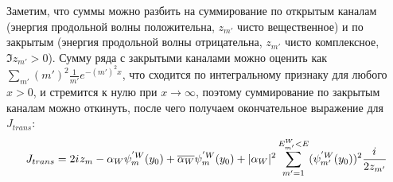 Заметим, что суммы можно разбить на суммирование по открытым каналам (энергия продольной волны положительна, $z_{m'}$ чисто вещественное) и по закрытым (энергия продольной волны отрицательна, $z_{m'}$ чисто комплексное, $\Im z_{m'} > 0$). Сумму ряда с закрытыми каналами можно оценить как $\sum\limits_{m'} (m')^2 \frac{1}{m'} e^{- (m')^2 x}$, что сходится по интегральному признаку для любого $x > 0$, и стремится к нулю при $x \to \infty$, поэтому суммирование по закрытым каналам можно откинуть, после чего получаем окончательное выражение для $J_{trans}$:
\begin{align*}
J_{trans} = 2 {i\mkern1mu} z_m - \alpha_W \psi_m^{'W}(y_0) + \overline{\alpha_W} \psi_m^{'W}(y_0) + |\alpha_W|^2 \sum_{m'= 1}^{E^W_{m'} < E} (\psi_{m'}^{'W}(y_0))^2 \frac{{i\mkern1mu}}{2 z_{m'}}
\end{align*}